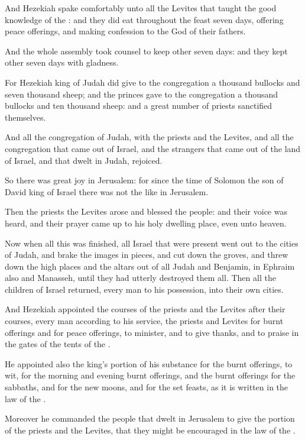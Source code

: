 \Verse And Hezekiah spake comfortably unto all the Levites that taught the good knowledge of the \LORD: and they did eat throughout the feast seven days, offering peace offerings, and making confession to the \LORD God of their fathers.

\Verse And the whole assembly took counsel to keep other seven days: and they kept other seven days with gladness.

\Verse For Hezekiah king of Judah did give to the congregation a thousand bullocks and seven thousand sheep; and the princes gave to the congregation a thousand bullocks and ten thousand sheep: and a great number of priests sanctified themselves.

\Verse And all the congregation of Judah, with the priests and the Levites, and all the congregation that came out of Israel, and the strangers that came out of the land of Israel, and that dwelt in Judah, rejoiced.

\Verse So there was great joy in Jerusalem: for since the time of Solomon the son of David king of Israel there was not the like in Jerusalem.

\Verse Then the priests the Levites arose and blessed the people: and their voice was heard, and their prayer came up to his holy dwelling place, even unto heaven.


\Chapter
\Verse Now when all this was finished, all Israel that were present went out to the cities of Judah, and brake the images in pieces, and cut down the groves, and threw down the high places and the altars out of all Judah and Benjamin, in Ephraim also and Manasseh, until they had utterly destroyed them all. Then all the children of Israel returned, every man to his possession, into their own cities.

\Verse And Hezekiah appointed the courses of the priests and the Levites after their courses, every man according to his service, the priests and Levites for burnt offerings and for peace offerings, to minister, and to give thanks, and to praise in the gates of the tents of the \LORD.

\Verse He appointed also the king's portion of his substance for the burnt offerings, to wit, for the morning and evening burnt offerings, and the burnt offerings for the sabbaths, and for the new moons, and for the set feasts, as it is written in the law of the \LORD.

\Verse Moreover he commanded the people that dwelt in Jerusalem to give the portion of the priests and the Levites, that they might be encouraged in the law of the \LORD.

